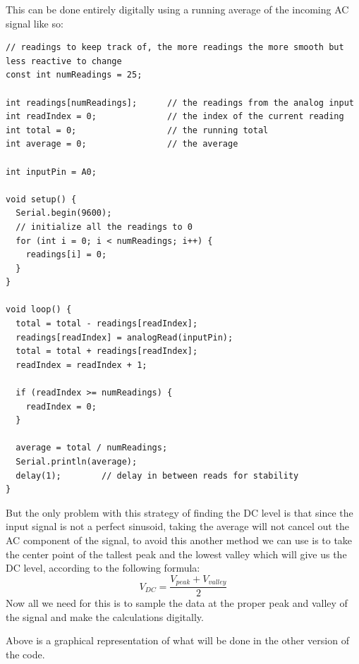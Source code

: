 \documentclass{article}
\begin{document}
This can be done entirely digitally using a running average of the incoming AC signal like so:
\begin{lstlisting}[language=Arduino, caption= DC Average Code]
// readings to keep track of, the more readings the more smooth but less reactive to change
const int numReadings = 25;    

int readings[numReadings];      // the readings from the analog input
int readIndex = 0;              // the index of the current reading
int total = 0;                  // the running total
int average = 0;                // the average

int inputPin = A0;

void setup() {
  Serial.begin(9600);
  // initialize all the readings to 0
  for (int i = 0; i < numReadings; i++) {
    readings[i] = 0;
  }
}

void loop() {
  total = total - readings[readIndex];
  readings[readIndex] = analogRead(inputPin);
  total = total + readings[readIndex];
  readIndex = readIndex + 1;

  if (readIndex >= numReadings) {
    readIndex = 0;
  }

  average = total / numReadings;
  Serial.println(average);
  delay(1);        // delay in between reads for stability
}
\end{lstlisting}
But the only problem with this strategy of finding the DC level is that since the input signal is not a perfect sinusoid, taking the average will not cancel out the AC component of the signal, to avoid this another method we can use is to take the center point of the tallest peak and the lowest valley which will give us the DC level, according to the following formula:
\begin{equation}
    V_{DC} = \frac{V_{peak}+V_{valley}}{2}
\end{equation}
Now all we need for this is to sample the data at the proper peak and valley of the signal and make the calculations digitally.
\begin{center}
\end{center}
Above is a graphical representation of what will be done in the other version of the code.
\newpage
\end{document}
